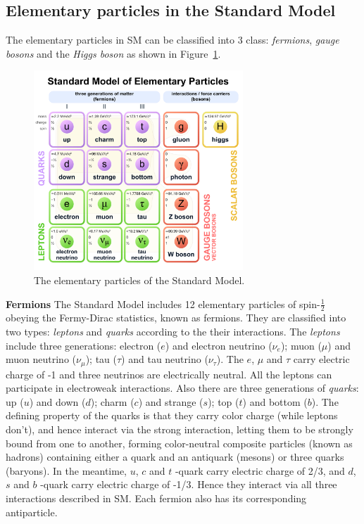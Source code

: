 \subsection{Elementary particles in the Standard Model}
\label{elementaryparticles}

The elementary particles in SM can be classified into 3 class: \textit{fermions}, \textit{gauge bosons} and the \textit{Higgs boson} as shown in Figure~\ref{fig:eleP-1}.
\begin{figure}[!htb]
  \centering
  \includegraphics[width=0.7\textwidth]{figures/Theory/Standard_Model_of_Elementary_Particles.pdf}
  \caption{The elementary particles of the Standard Model.}
  \label{fig:eleP-1}
\end{figure}

\textbf{Fermions}
The Standard Model includes 12 elementary particles of spin-$\frac{1}{2}$ obeying the Fermy-Dirac statistics, known as fermions. 
They are classified into two types: \textit{leptons} and \textit{quarks} according to the their interactions.
The \textit{leptons} include three generations: electron ($e$) and electron neutrino ($\nu_{e}$); 
muon ($\mu$) and muon neutrino ($\nu_{\mu}$); tau ($\tau$) and tau neutrino ($\nu_{\tau}$).
The $e$, $\mu$ and $\tau$ carry electric charge of -1 and three neutrinos are electrically neutral. 
All the leptons can participate in electroweak interactions.
Also there are three generations of \textit{quarks}: up ($u$) and down ($d$); charm ($c$) and strange ($s$); top ($t$) and bottom ($b$).
The defining property of the quarks is that they carry color charge (while leptons don't), and hence interact via the strong interaction, 
letting them to be strongly bound from one to another, forming color-neutral composite 
particles (known as hadrons) containing either a quark and an antiquark (mesons) or three quarks (baryons).
In the meantime, $u$, $c$ and $t$ -quark carry electric charge of 2/3, and $d$, $s$ and $b$ -quark carry electric charge of -1/3. 
Hence they interact via all three interactions described in SM.
Each fermion also has its corresponding antiparticle.

